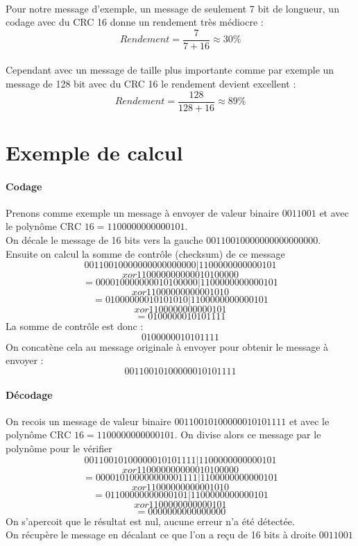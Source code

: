         \paragraph{}
Pour notre message d'exemple, un message de seulement 7 bit de longueur, un codage avec du CRC 16 donne un rendement très médiocre :
\[  Rendement = \frac{7}{7 + 16} \approx 30\%  \]
        \paragraph{}
Cependant avec un message de taille plus importante comme par exemple un message de 128 bit avec du CRC 16 le rendement devient excellent :
\[  Rendement = \frac{128}{128 + 16} \approx 89\%  \]


    \section{Exemple de calcul}
        \paragraph{Codage}
Prenons comme exemple un message à envoyer de valeur binaire $ 0011001 $
et avec le polynôme $ \text{CRC 16} = 1100000000000101 $.
\\On décale le message de 16 bits vers la gauche $ 00110010000000000000000 $.
Ensuite on calcul la somme de contrôle (checksum) de ce message
\[ 00110010000000000000000 | 1100000000000101 \]
\[ xor 110000000000010100000 \]
\[ = 000010000000010100000 | 1100000000000101 \]
\[ xor 11000000000001010 \]
\[ = 01000000010101010 | 1100000000000101 \]
\[ xor 1100000000000101 \]
\[ = 0100000010101111 \]
La somme de contrôle est donc :
\[ 0100000010101111 \]
On concatène cela au message originale à envoyer pour obtenir le message à envoyer :
\[ 00110010100000010101111 \]
        \paragraph{Décodage}
On recois un message de valeur binaire $ 00110010100000010101111 $
et avec le polynôme $ \text{CRC 16} = 1100000000000101 $.
On divise alors ce message par le polynôme pour le vérifier
\[ 00110010100000010101111 | 1100000000000101 \]
\[ xor 110000000000010100000 \]
\[ = 000010100000000001111 | 1100000000000101 \]
\[ xor 11000000000001010 \]
\[ = 01100000000000101 | 1100000000000101 \]
\[ xor 1100000000000101 \]
\[ = 0000000000000000 \]
On s'apercoit que le résultat est nul, aucune erreur n'a été détectée.
\\On récupère le message en décalant ce que l'on a reçu de 16 bits à droite $ 0011001 $

